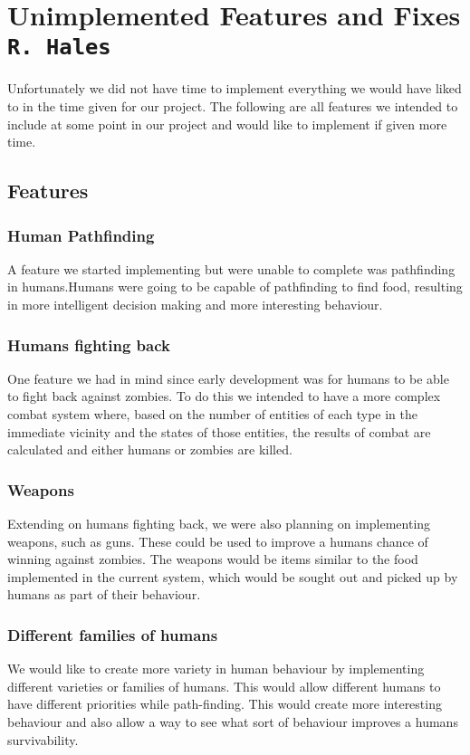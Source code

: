 \pagestyle{empty}
\section{Unimplemented Features and Fixes\\{\small\tt{R.~Hales}}}
Unfortunately we did not have time to implement everything we would have liked to in the time given for our project. The following are all features we intended to include at some point in our project and would like to implement if given more time.

\subsection{Features}

\subsubsection{Human Pathfinding}
A feature we started implementing but were unable to complete was pathfinding in humans.Humans were going to be capable of pathfinding to find food, resulting in more intelligent decision making and more interesting behaviour.

\subsubsection{Humans fighting back}
One feature we had in mind since early development was for humans to be able to fight back against zombies. To do this we  intended to have a more complex combat system where, based on the number of entities of each type in the immediate vicinity and the states of those entities, the results of combat are calculated and either humans or zombies are killed.

\subsubsection{Weapons}
Extending on humans fighting back, we were also planning on implementing weapons, such as guns. These could be used to improve a humans chance of winning against zombies. The weapons would be items similar to the food implemented in the current system, which would be sought out and picked up by humans as part of their behaviour.

\subsubsection{Different families of humans}
 We would like to create more variety in human behaviour by implementing different varieties or families of humans. This would allow different humans to have different priorities while path-finding. This would create more interesting behaviour and also allow a way to see what sort of behaviour improves a humans survivability.

